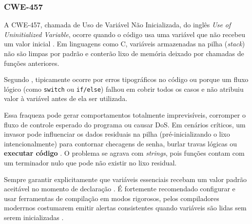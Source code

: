 \documentclass[
    12pt,                %
    openright,           %
    oneside,             %
    a4paper,             %
    english,             %
    brazil               %
]{abntex2}
\begin{document}
\begin{itemize}
\subsubsection{CWE-457}
\label{sec:457}
\par
A CWE-457, chamada de Uso de Variável Não Inicializada, do inglês \textit{Use of Uninitialized Variable}, ocorre quando o código usa uma variável que não recebeu um valor inicial \cite{cwe457}.
Em linguagens como C, variáveis armazenadas na pilha (\textit{stack}) não são limpas por padrão e conterão lixo de memória deixado por chamadas de funções anteriores.
\par
Segundo , tipicamente ocorre por erros tipográficos no código ou porque um fluxo lógico (como \texttt{switch} ou \texttt{if/else}) falhou em cobrir todos os casos e não atribuiu valor à variável antes de ela ser utilizada.
\par
Essa fraqueza pode gerar comportamentos totalmente imprevisíveis, corromper o fluxo de controle esperado do programa ou causar DoS.
Em cenários críticos, um invasor pode influenciar os dados residuais na pilha (pré-inicializando o lixo intencionalmente) para contornar checagens de senha, burlar travas lógicas ou \textbf{executar código} \cite{cwe457}.
O problema se agrava com \textit{strings}, pois funções contam com um terminador nulo que pode não existir no lixo residual.
\par
Sempre garantir explicitamente que variáveis essenciais recebam um valor padrão aceitável no momento de declaração \cite{cwe457}.
É fortemente recomendado configurar e usar ferramentas de compilação em modos rigorosos, pelos compiladores moderrnos costumarem emitir alertas consistentes quando variáveis são lidas sem serem inicializadas \cite{cwe457}.


\end{itemize}
\end{document}

